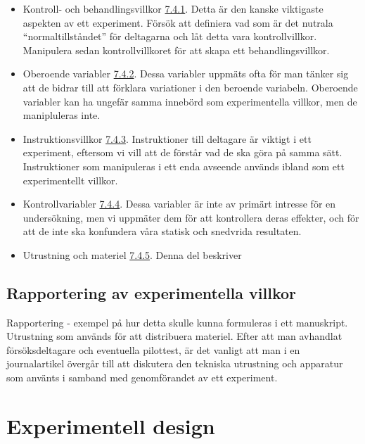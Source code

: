 \documentclass[
]{book}
\begin{document}
\begin{itemize}
\item
  Kontroll- och behandlingsvillkor \protect\hyperlink{sub07.4.1}{7.4.1}. Detta är den kanske viktigaste aspekten av ett experiment. Försök att definiera vad som är det nutrala ``normaltillståndet'' för deltagarna och låt detta vara kontrollvillkor. Manipulera sedan kontrollvillkoret för att skapa ett behandlingsvillkor.
\item
  Oberoende variabler \protect\hyperlink{sub07.4.2}{7.4.2}. Dessa variabler uppmäts ofta för man tänker sig att de bidrar till att förklara variationer i den beroende variabeln. Oberoende variabler kan ha ungefär samma innebörd som experimentella villkor, men de manipluleras inte.
\item
  Instruktionsvillkor \protect\hyperlink{sub07.4.3}{7.4.3}. Instruktioner till deltagare är viktigt i ett experiment, eftersom vi vill att de förstår vad de ska göra på samma sätt. Instruktioner som manipuleras i ett enda avseende används ibland som ett experimentellt villkor.
\item
  Kontrollvariabler \protect\hyperlink{sub07.4.4}{7.4.4}. Dessa variabler är inte av primärt intresse för en undersökning, men vi uppmäter dem för att kontrollera deras effekter, och för att de inte ska konfundera våra statisk och snedvrida resultaten.
\item
  Utrustning och materiel \protect\hyperlink{sub07.4.5}{7.4.5}. Denna del beskriver
\end{itemize}

\hypertarget{sub07.4.7}{%
\subsection{Rapportering av experimentella villkor}\label{sub07.4.7}}

Rapportering - exempel på hur detta skulle kunna formuleras i ett manuskript. Utrustning som används för att distribuera materiel. Efter att man avhandlat försöksdeltagare och eventuella pilottest, är det vanligt att man i en journalartikel övergår till att diskutera den tekniska utrustning och apparatur som använts i samband med genomförandet av ett experiment.

\hypertarget{sec07.5}{%
\section{Experimentell design}\label{sec07.5}}
\end{document}
